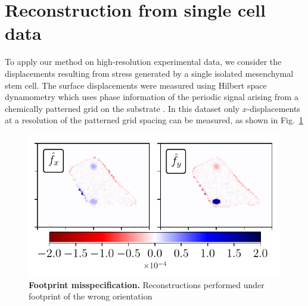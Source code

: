 \documentclass[aps,prl,reprint,twocolumn,groupedaddress,showpacs]{revtex4}
\begin{document}
\section{Reconstruction from single cell data}

To apply our method on high-resolution experimental data, we consider
the displacements resulting from stress generated by a single isolated
mesenchymal stem cell. The surface displacements were measured using
Hilbert space dynamometry which uses phase information of the periodic
signal arising from a chemically patterned grid on the substrate
\cite{POPESCU}.  In this dataset only $x$-displacements at a
resolution of the patterned grid spacing can be measured, as shown in
Fig.~\ref{DATA}



\begin{figure}
\includegraphics[width=\linewidth]{fig7}
\caption{\textbf{Footprint misspecification.} Reconstructions performed under footprint of the wrong orientation}
\label{DATA}
\end{figure}
\end{document}

